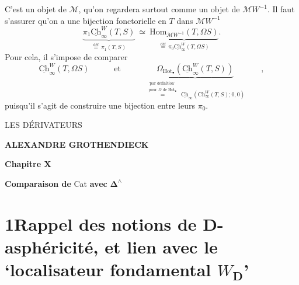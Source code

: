 \documentclass[11pt]{article}
\newcommand{\printedpage}[1]{\marginpar{\footnotesize p.~#1}}
\newcommand{\msp}[1]{\marginpar{\footnotesize [#1]}}
\newcommand{\Hot}{\mathrm{Hot}}
\newcommand{\Chu}{\underline{\mathrm{Ch}}}
\newcommand{\bDelta}{\boldsymbol{\Delta}}
\begin{document}
\newpage

\printedpage{16}

C'est un objet de $\mathcal{M}$, qu'on regardera surtout comme un objet de $\mathcal{M}W^{-1}$. Il faut s'assurer qu'on a une bijection fonctorielle en $T$ dans $\mathcal{M}W^{-1}$
\[
\underbrace{\pi_1\Chu^W_\infty(T, S)}_{\overset{\text{déf}}{=}\,\pi_1(T,S)} \ \simeq\ \underbrace{\mathrm{Hom}_{\mathcal{M}W^{-1}}(T, \Omega S)}_{\overset{\text{déf}}{=}\,\pi_0\Chu^W_\infty(T,\Omega S)}.
\]
Pour cela, il s'impose de comparer
\[
\Chu^W_\infty(T, \Omega S) \qquad\quad \text{et} \qquad\quad \underbrace{\Omega_{\Hot_\bullet}(\Chu^W_\infty(T, S))}_{\overset{\substack{\text{`par définition'}\\ \text{pour $\Omega$ de $\mathrm{Hot}_\bullet$}}}{=}\ \Chu_\infty(\mathrm{Ch}^W_\infty(T,S);0,0)} \qquad ,
\]
puisqu'il s'agit de construire une bijection entre leurs $\pi_0$.

\printedpage{}

\begin{center}
{\LARGE \textsf{LES DÉRIVATEURS}}

\bigskip

{\large \textbf{ALEXANDRE GROTHENDIECK}}

\vspace{3em}

{\large \textbf{Chapitre X}}

\medskip

{\large \textbf{Comparaison de} Cat \textbf{avec} $\bDelta^{\wedge}$}
\end{center}

\clearpage

\printedpage{}


\clearpage

\printedpage{1}

\msp{page 1}

\section*{1\quad Rappel des notions de D-asphéricité, et lien avec le ‘localisateur fondamental $W_{\mathbf{D}}$’}
\end{document}
